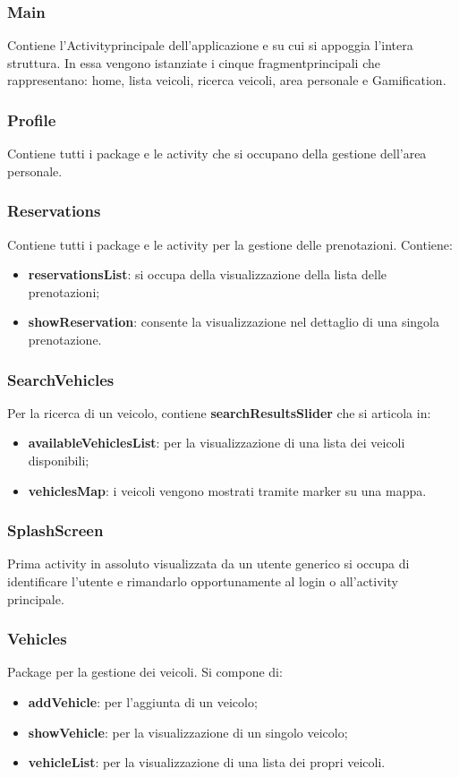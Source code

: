 \subsubsection{Main}
Contiene l'Activity\glosp principale dell'applicazione e su cui si appoggia l'intera struttura. In essa vengono istanziate i cinque fragment\glosp principali che rappresentano: home, lista veicoli, ricerca veicoli, area personale e Gamification\glo.
\subsubsection{Profile}
Contiene tutti i package e le activity che si occupano della gestione dell'area personale.
\subsubsection{Reservations}
Contiene tutti i package e le activity per la gestione delle prenotazioni.
Contiene:
\begin{itemize}
	\item \textbf{reservationsList}: si occupa della visualizzazione della lista delle prenotazioni;
	\item \textbf{showReservation}: consente la visualizzazione nel dettaglio di una singola prenotazione.
\end{itemize}
\subsubsection{SearchVehicles}
Per la ricerca di un veicolo, contiene \textbf{searchResultsSlider} che si articola in:
\begin{itemize}
	\item \textbf{availableVehiclesList}: per la visualizzazione di una lista dei veicoli disponibili;
	\item \textbf{vehiclesMap}: i veicoli vengono mostrati tramite marker su una mappa.
\end{itemize}
\subsubsection{SplashScreen}
Prima activity in assoluto visualizzata da un utente generico si occupa di identificare l'utente e rimandarlo opportunamente al login o all'activity principale.
\subsubsection{Vehicles}
Package per la gestione dei veicoli. Si compone di:
\begin{itemize}
	\item \textbf{addVehicle}: per l'aggiunta di un veicolo;
	\item \textbf{showVehicle}: per la visualizzazione di un singolo veicolo;
	\item \textbf{vehicleList}: per la visualizzazione di una lista dei propri veicoli.
\end{itemize}